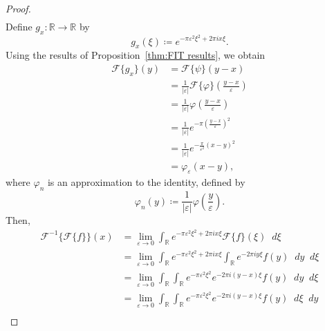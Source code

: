 \documentclass[a4paper]{article}
\newcommand*\diff{\mathop{}\!d} %
\newcommand{\R}{\mathbb{R}}
\theoremstyle{definition}
\begin{document}
\begin{proof}
\begin{align*}
    \end{align*}
    Define $g_x \colon \R \to \R$ by
    \begin{equation*}
        g_x(\xi) \coloneq e^{- \pi \varepsilon^2 \xi^2 + 2\pi i x \xi}.
    \end{equation*}
    Using the results of Proposition~\ref{thm:FIT results}, we obtain
    \begin{align*}
        \mathcal{F}\{g_x\}(y) & = \mathcal{F}\{\psi\}(y-x)                                                                       \\
                              & = \frac{1}{\lvert \varepsilon \rvert} \mathcal{F}\{\varphi\}\left(\frac{y-x}{\varepsilon}\right) \\
                              & = \frac{1}{\lvert \varepsilon \rvert} \varphi\left(\frac{y-x}{\varepsilon}\right)                \\
                              & = \frac{1}{\lvert \varepsilon \rvert} e^{-\pi \left( \frac{y-x}{\varepsilon} \right)^2}          \\
                              & = \frac{1}{\lvert \varepsilon \rvert} e^{-\frac{\pi}{\varepsilon^2} (x-y)^2}                     \\
                              & = \varphi_\varepsilon (x-y),
    \end{align*}
    where $\varphi_n$ is an approximation to the identity, defined by
    \begin{equation*}
        \varphi_n (y) \coloneq \frac{1}{\lvert\varepsilon\rvert}\varphi \left(\frac{y}{\varepsilon}\right).
    \end{equation*}
    Then,
    \begin{align*}
        \mathcal{F}^{-1}\{\mathcal{F}\{f\}\}(x) & = \lim_{\varepsilon \to 0} \int_\R e^{- \pi \varepsilon^2 \xi^2 + 2\pi i x \xi} \mathcal{F}\{f\}(\xi) \diff \xi                  \\
                                                & = \lim_{\varepsilon \to 0} \int_\R e^{- \pi \varepsilon^2 \xi^2 + 2\pi i x \xi} \int_\R e^{-2\pi i y \xi} f(y) \diff y \diff \xi \\
                                                & = \lim_{\varepsilon \to 0} \int_\R \int_\R e^{- \pi \varepsilon^2 \xi^2} e^{-2\pi i (y-x) \xi} f(y) \diff y \diff \xi            \\
                                                & = \lim_{\varepsilon \to 0} \int_\R \int_\R e^{- \pi \varepsilon^2 \xi^2} e^{-2\pi i (y-x) \xi} f(y) \diff \xi \diff y            \\

\end{align*}
\end{proof}
\end{document}
